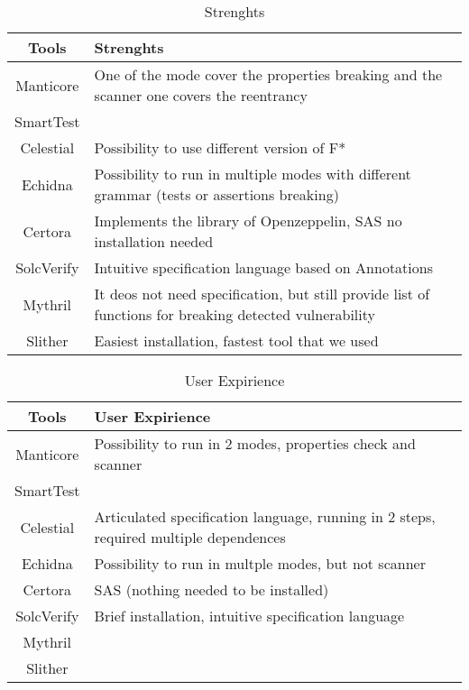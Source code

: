\begin{table*}
    \caption{Strenghts}
    \label{tab:Strenghts}
    \begin{tabular}{cl}
    \toprule
        Tools  &  Strenghts \\
        \midrule
        Manticore & One of the mode cover the properties breaking and the scanner one covers the reentrancy\\
        SmartTest &  \\
        Celestial & Possibility to use different version of F*  \\
        Echidna &  Possibility to run in multiple modes with different grammar (tests or assertions breaking)\\
        Certora & Implements the library of Openzeppelin, SAS no installation needed \\ 
        SolcVerify & Intuitive specification language based on Annotations\\
        Mythril & It deos not need specification, but still provide list of functions for breaking detected vulnerability  \\ 
        Slither & Easiest installation, fastest tool that we used \\ 
    \bottomrule
    \end{tabular}
\end{table*}

\begin{table*}
    
    \caption{User Expirience}
    \label{tab:UX}
    \begin{tabular}{cl}
    \toprule
        Tools  &  User Expirience \\
        \midrule
        Manticore & Possibility to run in 2 modes, properties check and scanner  \\
        SmartTest &  \\
        Celestial & Articulated specification language, running in 2 steps, required multiple dependences \\
        Echidna & Possibility to run in multple modes, but not scanner \\
        Certora & SAS (nothing needed to be installed) \\ 
        SolcVerify & Brief installation, intuitive specification language \\
        Mythril  \\ 
        Slither \\   
    \bottomrule
    \end{tabular}
\end{table*}

